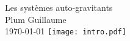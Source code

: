 \begin{titlepage}
\begin{center}
	\vspace{8cm}
		\Huge Les systèmes auto-gravitants \\
		\Large Plum Guillaume \\
		\today
	\vfill
			\centering \texttt{[image: intro.pdf]}
	\end{center}
	\thispagestyle{empty}
\end{titlepage}
